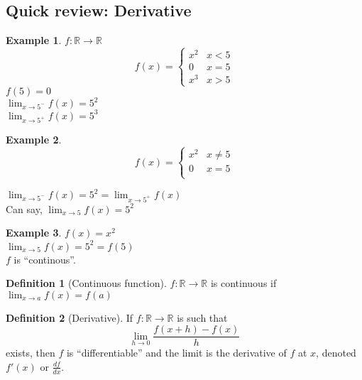 \documentclass[twocolumn,20pt,fleqn]{extarticle}
\theoremstyle{plain}
\theoremstyle{definition}
\newtheorem*{definition}{Definition}
\newtheorem*{example}{Example}
\theoremstyle{remark}
\begin{document}
\subsection{Quick review: Derivative}
\begin{example}
  $f : \mathbb{R}\to \mathbb{R}$
  \[f(x) =
      \begin{cases}
        x^2 & x < 5\\
        0 & x = 5\\
        x^3 & x > 5
      \end{cases}
      \]
      $f(5)=0$\\
$\displaystyle\lim_{x \to 5^-} f(x)  = 5^2$\\
$\displaystyle\lim_{x \to 5^+} f(x)  = 5^3$
\end{example}


\begin{example}
  \[f(x) =
      \begin{cases}
        x^2 & x  \neq  5\\
        0 & x = 5\\
        
      \end{cases}
      \]
      
      


$\displaystyle\lim_{x \to 5^-} f(x) = 5^2  = \displaystyle\lim_{x \to 5^+} f(x)$\\
Can say, $\displaystyle\lim_{x \to 5} f(x) = 5^2$
\end{example}

\newpage
\begin{example}
$f(x) = x^2$\\
$\displaystyle\lim_{x \to 5} f(x) = 5^2 = f(5)$\\
$f$ is ``continous''.
\end{example}

\begin{definition}[Continuous function]
$f : \mathbb{R} \to \mathbb{R}$ is continuous if $\displaystyle\lim_{x \to a} f(x) = f(a)$
\end{definition}

\begin{definition}[Derivative]
  If $f : \mathbb{R}\to \mathbb{R}$ is such that
  \[\displaystyle\lim_{h\to 0}\frac{f(x+h) - f(x)}{h}\] exists, then $f$ is ``differentiable'' and the limit is the derivative of $f$ at $x$, denoted $f'(x)$ or $\frac{df}{dx}$. \end{definition}


\clearpage
\end{document}
